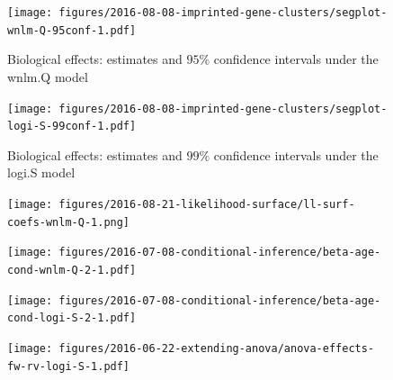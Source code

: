 \documentclass[letterpaper]{article}
\begin{document}
\begin{figure}
\begin{center}
\texttt{[image: figures/2016-08-08-imprinted-gene-clusters/segplot-wnlm-Q-95conf-1.pdf]}
\end{center}
\caption{Biological effects: estimates and $95\%$ confidence intervals under
the wnlm.Q model}
\label{fig:biol-effects-wnlm-Q-95}
\end{figure}

\begin{figure}
\begin{center}
\texttt{[image: figures/2016-08-08-imprinted-gene-clusters/segplot-logi-S-99conf-1.pdf]}
\end{center}
\caption{Biological effects: estimates and $99\%$ confidence intervals under
the logi.S model}
\label{fig:biol-effects-logi-S-99}
\end{figure}

\begin{figure}
\begin{center}
\texttt{[image: figures/2016-08-21-likelihood-surface/ll-surf-coefs-wnlm-Q-1.png]}
\end{center}
\caption{}
\label{fig:likelihood-surface}
\end{figure}

\begin{figure}
\begin{center}
\texttt{[image: figures/2016-07-08-conditional-inference/beta-age-cond-wnlm-Q-2-1.pdf]}
\end{center}
\caption{}
\label{fig:interaction-wnlm-Q}
\end{figure}

\begin{figure}
\begin{center}
\texttt{[image: figures/2016-07-08-conditional-inference/beta-age-cond-logi-S-2-1.pdf]}
\end{center}
\caption{}
\label{fig:interaction-logi-S}
\end{figure}

\begin{figure}
\begin{center}
\texttt{[image: figures/2016-06-22-extending-anova/anova-effects-fw-rv-logi-S-1.pdf]}
\end{center}
\caption{}
\label{fig:anova}
\end{figure}


\setcounter{table}{0}
\makeatletter 
\renewcommand{\thetable}{S\@arabic\c@table}
\makeatother
\end{document}
